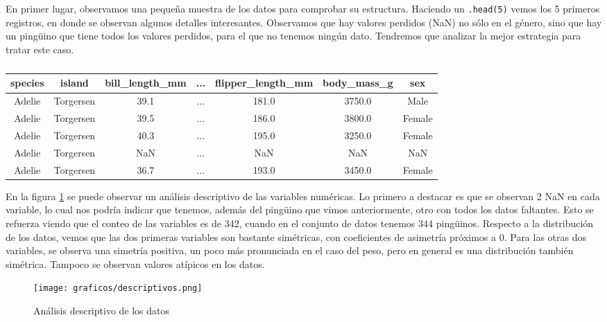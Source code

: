 \documentclass[a4paper,onecolumn]{extarticle}
\begin{document}
\begin{sloppypar}
En primer lugar, observamos una pequeña muestra de los datos para comprobar su estructura. Haciendo un \texttt{.head(5)} vemos los 5 primeros registros, en 
donde se observan algunos detalles interesantes. Observamos que hay valores perdidos (NaN) no sólo en el género, sino que hay un pingüino que tiene todos 
los valores perdidos, para el que no tenemos ningún dato. Tendremos que analizar la mejor estrategia para tratar este caso.
\begin{table}[h!]
    \begin{tabular}{|c c c c c c c|}
        \hline
        \textbf{species} & \textbf{island} & \textbf{bill\_length\_mm} & \textbf{...} & \textbf{flipper\_length\_mm} & \textbf{body\_mass\_g} & \textbf{sex} \\
        \hline
        Adelie & Torgersen & 39.1 & ... & 181.0 & 3750.0 & Male \\
        Adelie & Torgersen & 39.5 & ... & 186.0 & 3800.0 & Female \\
        Adelie & Torgersen & 40.3 & ... & 195.0 & 3250.0 & Female \\
        Adelie & Torgersen & NaN & ... & NaN & NaN & NaN \\
        Adelie & Torgersen & 36.7 & ... & 193.0 & 3450.0 & Female \\
        \hline
    \end{tabular}
    \caption{}
    \label{tab:headDF}
\end{table}

En la figura \ref{fig:descriptivos} se puede observar un análisis descriptivo de las variables numéricas. Lo primero a destacar es que se observan 2 NaN en 
cada variable, lo cual nos podría indicar que tenemos, además del pingüino que vimos anteriormente, otro con todos los datos faltantes. Esto se refuerza 
viendo que el conteo de las variables es de 342, cuando en el conjunto de datos tenemos 344 pingüinos. Respecto a la distribución de los datos, vemos que las 
dos primeras variables son bastante simétricas, con coeficientes de asimetría próximos a 0. Para las otras dos variables, se observa una simetría positiva, 
un poco más pronunciada en el caso del peso, pero en general es una distribución también simétrica. Tampoco se observan valores atípicos en los datos.
\begin{center}
    \begin{figure}[h!]
        \centering
        \texttt{[image: graficos/descriptivos.png]}
        \caption{Análisis descriptivo de los datos}
        \label{fig:descriptivos}
    \end{figure}
\end{center}


\end{sloppypar}
\end{document}
